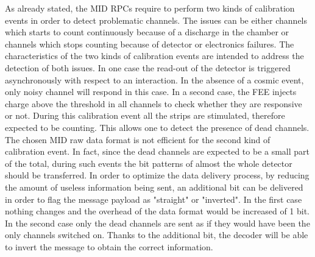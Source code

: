 As already stated, the MID RPCs require to perform two kinds of calibration events in order to detect problematic channels.
The issues can be either channels which starts to count continuously because of a discharge in the chamber or channels which stops counting because of detector or electronics failures.
The characteristics of the two kinds of calibration events are intended to address the detection of both issues.
In one case the read-out of the detector is triggered asynchronously with respect to an interaction.
In the absence of a cosmic event, only noisy channel will respond in this case.
In a second case, the FEE injects charge above the threshold in all channels to check whether they are responsive or not.
During this calibration event all the strips are stimulated, therefore expected to be counting.
This allows one to detect the presence of dead channels.
The chosen MID raw data format is not efficient for the second kind of calibration event.
In fact, since the dead channels are expected to be a small part of the total, during such events the bit patterns of almost the whole detector should be transferred.
In order to optimize the data delivery process, by reducing the amount of useless information being sent, an additional bit can be delivered in order to flag the message payload as "straight" or "inverted".
In the first case nothing changes and the overhead of the data format would be increased of 1 bit.
In the second case only the dead channels are sent as if they would have been the only channels switched on.
Thanks to the additional bit, the decoder will be able to invert the message to obtain the correct information.

